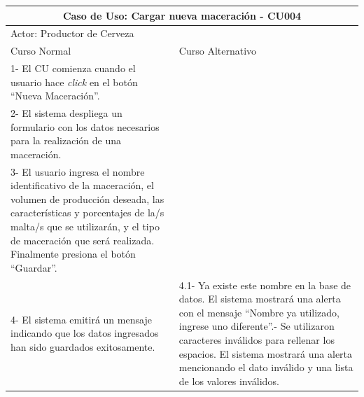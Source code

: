     
    \begin{minipage}{0.95\textwidth}
    \begin{center}
    \begin{tabularx}{\textwidth}{ | X | X |}
        \hline
        \multicolumn{2}{|c|}{\textbf{Caso de Uso: Cargar nueva maceración - CU004}} \\
        \hline
        \multicolumn{2}{|l|}{Actor: Productor de Cerveza} \\
        \hline
        Curso Normal & Curso Alternativo \\
        \hline
        1- El CU comienza cuando el usuario hace \textit{click} en el botón “Nueva Maceración”. & \\
        \hline
        2- El sistema despliega un formulario con los datos necesarios para la realización de una maceración. &
        \\
        \hline
        3- El usuario ingresa el nombre identificativo de la maceración, el volumen de producción deseada, las características y porcentajes de la/s malta/s que se utilizarán, y el tipo de maceración que será realizada. Finalmente presiona el botón “Guardar”. &
        \\
        \hline
        4- El sistema emitirá un mensaje indicando que los datos ingresados han sido guardados exitosamente.  & 
        4.1- Ya existe este nombre en la base de datos. El sistema mostrará una alerta con el mensaje “Nombre ya utilizado, ingrese uno diferente”.\newline 4.2- Se utilizaron caracteres inválidos para rellenar los espacios. El sistema mostrará una alerta mencionando el dato inválido y una lista de los valores inválidos.
        \\
        \hline
    \end{tabularx}
    \label{CU004}
    \end{center}
    \end{minipage}
    
